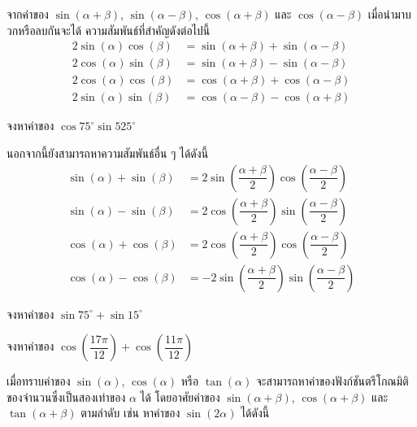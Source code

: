\newpage

\begin{remarkbox}
	จากค่าของ $\sin (\alpha+\beta)$, $\sin (\alpha-\beta)$, $\cos (\alpha+\beta)$ และ $\cos (\alpha-\beta)$ เมื่อนำมาบวกหรือลบกันจะได้ ความสัมพันธ์ที่สำคัญดังต่อไปนี้
	\[
\begin{aligned}
	2 \sin(\alpha) \cos(\beta) & = \sin(\alpha + \beta) + \sin(\alpha - \beta) \\
	2 \cos(\alpha) \sin(\beta) & = \sin(\alpha + \beta) - \sin(\alpha - \beta) \\
	2 \cos(\alpha) \cos(\beta) & = \cos(\alpha + \beta) + \cos(\alpha - \beta) \\
	2 \sin(\alpha) \sin(\beta) & = \cos(\alpha - \beta) - \cos(\alpha + \beta)
\end{aligned}
\]
\end{remarkbox}

\begin{examplebox}
	จงหาค่าของ $\cos 75^{\circ} \sin 525^{\circ}$
\end{examplebox}
\solution
\newpage

\begin{remarkbox}
	นอกจากนี้ยังสามารถหาความสัมพันธ์อื่น ๆ ได้ดังนี้
\[
\begin{aligned}
	\sin(\alpha) + \sin(\beta) & = 2 \sin\left( \dfrac{\alpha+\beta}{2} \right) \cos\left( \dfrac{\alpha-\beta}{2} \right) \\
	\sin(\alpha) - \sin(\beta) & = 2 \cos\left( \dfrac{\alpha+\beta}{2} \right) \sin\left( \dfrac{\alpha-\beta}{2} \right) \\
	\cos(\alpha) + \cos(\beta) & = 2 \cos\left( \dfrac{\alpha+\beta}{2} \right) \cos\left( \dfrac{\alpha-\beta}{2} \right) \\
	\cos(\alpha) - \cos(\beta) & = -2 \sin\left( \dfrac{\alpha+\beta}{2} \right) \sin\left( \dfrac{\alpha-\beta}{2} \right)
\end{aligned}
\]
\end{remarkbox}

\begin{examplebox}
	จงหาค่าของ $\sin 75^{\circ}+\sin 15^{\circ}$
\end{examplebox}
\solution
\newpage

\begin{examplebox}
	จงหาค่าของ $\cos \left( \dfrac{17 \pi}{12} \right)+\cos \left( \dfrac{11 \pi}{12} \right)$
\end{examplebox}
\solution
\newpage

\noindent เมื่อทราบค่าของ $\sin(\alpha)$, $\cos(\alpha)$ หรือ $\tan(\alpha)$ จะสามารถหาค่าของฟังก์ชันตรีโกณมิติของจำนวนซึ่งเป็นสองเท่าของ $\alpha$ ได้ โดยอาศัยค่าของ $\sin(\alpha+\beta)$, $\cos(\alpha+\beta)$ และ $\tan(\alpha+\beta)$ ตามลำดับ เช่น หาค่าของ $\sin(2\alpha)$ ได้ดังนี้


